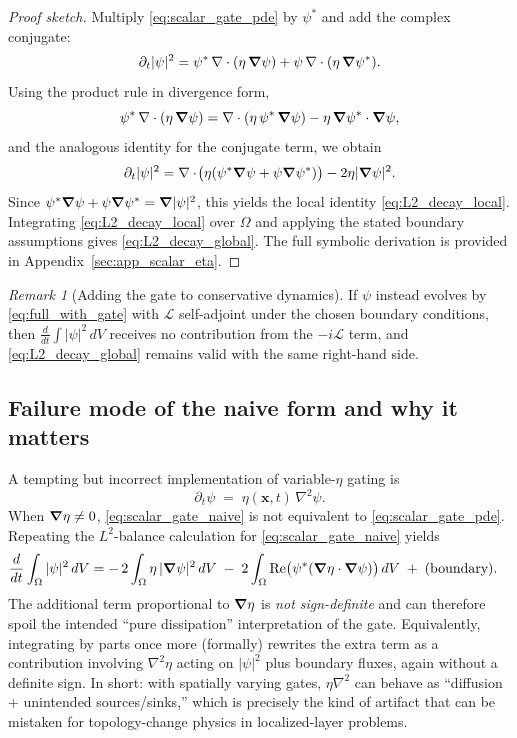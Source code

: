 \documentclass[11pt]{article}
\theoremstyle{plain}
\theoremstyle{definition}
\theoremstyle{remark}
\newtheorem{remark}{Remark}
\newcommand{\diver}{\nabla\cdot}
\begin{document}
\begin{proof}[Proof sketch]
Multiply \eqref{eq:scalar_gate_pde} by $\psi^*$ and add the complex conjugate:
\[
\partial_t|\psi|^2
=
\psi^*\,\diver(\eta\,\grad\psi)
+
\psi\,\diver(\eta\,\grad\psi^*).
\]
Using the product rule in divergence form,
\[
\psi^*\,\diver(\eta\,\grad\psi)
=
\diver(\eta\,\psi^*\,\grad\psi) - \eta\,\grad\psi^*\cdot\grad\psi,
\]
and the analogous identity for the conjugate term, we obtain
\[
\partial_t|\psi|^2
=
\diver\!\big(\eta(\psi^*\grad\psi+\psi\grad\psi^*)\big) - 2\eta|\grad\psi|^2.
\]
Since $\psi^*\grad\psi+\psi\grad\psi^*=\grad|\psi|^2$, this yields the local identity
\eqref{eq:L2_decay_local}. Integrating \eqref{eq:L2_decay_local} over $\Omega$ and applying the stated
boundary assumptions gives \eqref{eq:L2_decay_global}. The full symbolic derivation is provided in
Appendix~\ref{sec:app_scalar_eta}. %
\end{proof}

\begin{remark}[Adding the gate to conservative dynamics]\label{rem:gate_plus_unitary}
If $\psi$ instead evolves by \eqref{eq:full_with_gate} with $\mathcal{L}$ self-adjoint under the chosen
boundary conditions, then $\frac{d}{dt}\int|\psi|^2\,dV$ receives no contribution from the
$-i\mathcal{L}$ term, and \eqref{eq:L2_decay_global} remains valid with the same right-hand side.
\end{remark}

\subsection{Failure mode of the naive form and why it matters}\label{sec:result_scalar_naive}
A tempting but incorrect implementation of variable-$\eta$ gating is
\begin{equation}\label{eq:scalar_gate_naive}
  \partial_t\psi \;=\; \eta(\mathbf{x},t)\,\nabla^2\psi.
\end{equation}
When $\grad\eta\neq 0$, \eqref{eq:scalar_gate_naive} is not equivalent to \eqref{eq:scalar_gate_pde}.
Repeating the $L^2$-balance calculation for \eqref{eq:scalar_gate_naive} yields
\begin{align}\label{eq:L2_decay_naive}
  \frac{d}{dt}\int_{\Omega}|\psi|^2\,dV
  &=
  -\,2\int_{\Omega}\eta\,|\grad\psi|^2\,dV
  \;-\;
  2\int_{\Omega}\Re\!\big(\psi^*(\grad\eta\cdot\grad\psi)\big)\,dV
  \;+\;\text{(boundary)}.
\end{align}
The additional term proportional to $\grad\eta$ is \emph{not sign-definite} and can therefore spoil the
intended ``pure dissipation'' interpretation of the gate. Equivalently, integrating by parts once more
(formally) rewrites the extra term as a contribution involving $\nabla^2\eta$ acting on $|\psi|^2$ plus
boundary fluxes, again without a definite sign. In short: with spatially varying gates, $\eta\nabla^2$
can behave as ``diffusion + unintended sources/sinks,'' which is precisely the kind of artifact that
can be mistaken for topology-change physics in localized-layer problems.
\end{document}
